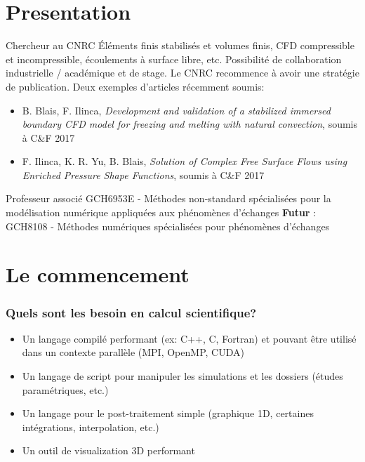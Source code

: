 \documentclass[]{beamer}
\begin{document}
\section{Presentation}
\begin{frame}[fragile]
\begin{block}{Chercheur au CNRC}
Éléments finis stabilisés et volumes finis, CFD compressible et incompressible, écoulements à surface libre, etc.
Possibilité de collaboration industrielle / académique et de stage.
Le CNRC recommence à avoir une stratégie de publication. Deux exemples d'articles récemment soumis:
\begin{itemize}
\item\footnotesize B. Blais, F. Ilinca, \textit{Development and validation of a stabilized immersed boundary CFD model for freezing and melting with natural convection}, soumis à C\&F 2017
\item F. Ilinca, K. R. Yu, B. Blais, \textit{Solution of Complex Free Surface Flows using Enriched Pressure Shape Functions}, soumis à C\&F 2017
\end{itemize}
\end{block}
\begin{block}{Professeur associé}
GCH6953E - Méthodes non-standard spécialisées pour la modélisation numérique appliquées aux phénomènes d’échanges 
\textbf{Futur} : GCH8108 - Méthodes numériques spécialisées pour phénomènes d'échanges
\end{block}
\end{frame}

\section{Le commencement}

\begin{frame}
\frametitle{Quels sont les besoin en calcul scientifique? }
\begin{itemize}
\item Un langage compilé performant (ex: C++, C, Fortran) et pouvant  être utilisé dans un contexte parallèle (MPI, OpenMP, CUDA)
\item Un langage de script pour manipuler les simulations et les dossiers (études paramétriques, etc.)
\item Un langage pour le post-traitement simple (graphique 1D, certaines intégrations, interpolation, etc.)
\item Un outil de visualization 3D performant
\end{itemize}
\end{frame}
\end{document}

